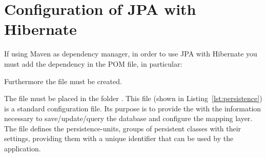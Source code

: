 \section{Configuration of JPA with Hibernate}

If using Maven as dependency manager, in order to use JPA with Hibernate you
must add the dependency in the POM file, in particular:



Furthermore the file  must be created.

The  file must be placed in the folder
. This file (shown in
Listing~\ref{lst:persistence}) is a standard configuration file. Its purpose is
to provide the  with the information necessary to
save/update/query the database and configure the mapping layer. The file defines
the persistence-units, groups of persistent classes with their settings,
providing them with a unique identifier that can be used by the application.


